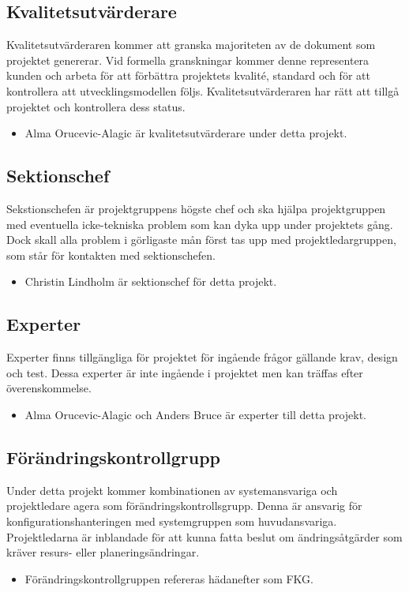 \documentclass[paper=a4, fontsize=11pt,twoside]{article}
\begin{document}
\subsection*{Kvalitetsutvärderare}
Kvalitetsutvärderaren kommer att granska majoriteten av de dokument som projektet genererar. Vid formella granskningar kommer denne representera kunden och arbeta för att förbättra projektets kvalité, standard och för att kontrollera att utvecklingsmodellen följs. Kvalitetsutvärderaren har rätt att tillgå projektet och kontrollera dess status.
\begin{itemize}
\item Alma Orucevic-Alagic är kvalitetsutvärderare under detta projekt.
\end{itemize}

\subsection*{Sektionschef}
Sekstionschefen är projektgruppens högste chef och ska hjälpa projektgruppen med eventuella icke-tekniska problem som kan dyka upp under projektets gång. Dock skall alla problem i görligaste mån först tas upp med projektledargruppen, som står för kontakten med sektionschefen.
\begin{itemize}
\item Christin Lindholm är sektionschef för detta projekt.
\end{itemize}
		
	 
\subsection*{Experter}
Experter finns tillgängliga för projektet för ingående frågor gällande krav, design och test. Dessa experter är inte ingående i projektet men kan träffas efter överenskommelse.
\begin{itemize}
\item Alma Orucevic-Alagic och Anders Bruce är experter till detta projekt.
\end{itemize}
	

\subsection*{Förändringskontrollgrupp}
Under detta projekt kommer kombinationen av systemansvariga och projektledare agera som förändringskontrollsgrupp. Denna är ansvarig för konfigurationshanteringen med systemgruppen som huvudansvariga. Projektledarna är inblandade för att kunna fatta beslut om ändringsåtgärder som kräver resurs- eller planeringsändringar.
\begin{itemize}
\item Förändringskontrollgruppen refereras hädanefter som FKG. 
\end{itemize}
		
\end{document}
